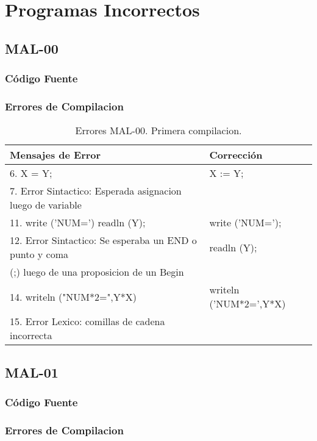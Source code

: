 \documentclass[a4paper,12pt]{article}
\begin{document}
\section{Programas Incorrectos}
\subsection{MAL-00}
\subsubsection{Código Fuente}

\subsubsection{Errores de Compilacion}

\begin{table}[H]
\centering
\begin{tabular}{|l|l|}
\hline
Mensajes de Error & Corrección\\
\hline
6. X = Y; 													&  X := Y;\\
7. Error Sintactico: Esperada asignacion luego de variable	& \\
\hline
11. write ('NUM=') readln (Y);								& write ('NUM=');\\ 
12. Error Sintactico: Se esperaba un END o punto y coma 		& readln (Y);\\
(;) luego de una proposicion de un Begin						&\\
\hline
14. writeln ("NUM*2=",Y*X)									& writeln ('NUM*2=',Y*X)\\
15. Error Lexico: comillas de cadena incorrecta				& \\
\hline
\end{tabular}
\caption{Errores MAL-00. Primera compilacion.}
\label{MAL-00-1}
\end{table}

\subsection{MAL-01}
\subsubsection{Código Fuente}

\subsubsection{Errores de Compilacion}
\end{document}
